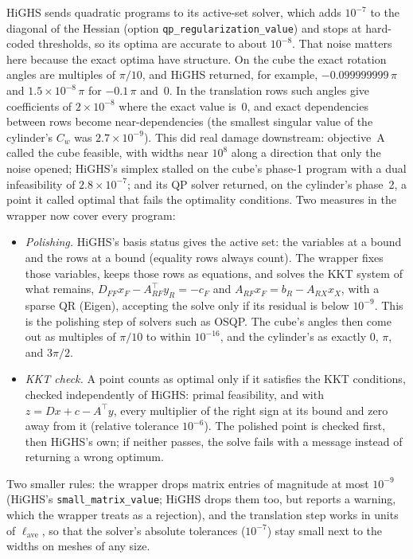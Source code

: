 \documentclass[11pt]{article}
\theoremstyle{definition}
\begin{document}
HiGHS sends quadratic programs to its active-set solver, which adds $10^{-7}$
to the diagonal of the Hessian (option \texttt{qp\_regularization\_value})
and stops at hard-coded thresholds, so its optima are accurate to about
$10^{-8}$. That noise matters here because the exact optima have structure.
On the cube the exact rotation angles are multiples of $\pi/10$, and HiGHS
returned, for example, $-0.099999999\,\pi$ and $1.5\times10^{-8}\,\pi$ for
$-0.1\,\pi$ and~$0$. In the translation rows such angles give coefficients of
$2\times10^{-8}$ where the exact value is~0, and exact dependencies between
rows become near-dependencies (the smallest singular value of the cylinder's
$C_w$ was $2.7\times10^{-9}$). This did real damage downstream: objective~A
called the cube feasible, with widths near $10^8$ along a direction that only
the noise opened; HiGHS's simplex stalled on the cube's phase-1 program with a
dual infeasibility of $2.8\times10^{-7}$; and its QP solver returned, on the
cylinder's phase~2, a point it called optimal that fails the optimality
conditions. Two measures in the wrapper now cover every program:
\begin{itemize}[nosep]
  \item \emph{Polishing.} HiGHS's basis status gives the active set: the
    variables at a bound and the rows at a bound (equality rows always count).
    The wrapper fixes those variables, keeps those rows as equations, and
    solves the KKT system of what remains,
    $D_{FF}x_F - A_{RF}^\top y_R = -c_F$ and $A_{RF}x_F = b_R - A_{RX}x_X$,
    with a sparse QR (Eigen), accepting the solve only if its residual is
    below $10^{-9}$. This is the polishing step of solvers such as OSQP. The
    cube's angles then come out as multiples of $\pi/10$ to within
    $10^{-16}$, and the cylinder's as exactly $0$, $\pi$, and $3\pi/2$.
  \item \emph{KKT check.} A point counts as optimal only if it satisfies the
    KKT conditions, checked independently of HiGHS: primal feasibility, and
    with $z = Dx + c - A^\top y$, every multiplier of the right sign at its
    bound and zero away from it (relative tolerance $10^{-6}$). The polished
    point is checked first, then HiGHS's own; if neither passes, the solve
    fails with a message instead of returning a wrong optimum.
\end{itemize}
Two smaller rules: the wrapper drops matrix entries of magnitude at most
$10^{-9}$ (HiGHS's \texttt{small\_matrix\_value}; HiGHS drops them too, but
reports a warning, which the wrapper treats as a rejection), and the
translation step works in units of $\ell_{\mathrm{ave}}$, so that the solver's
absolute tolerances ($10^{-7}$) stay small next to the widths on meshes of any
size.
\end{document}
